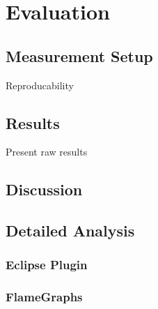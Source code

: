 \chapter{Evaluation}
\label{chap:analysis}


\section{Measurement Setup}

Reproducability

\section{Results}

Present raw results


\section{Discussion}


\section{Detailed Analysis}


\subsection{Eclipse Plugin}

\subsection{FlameGraphs}